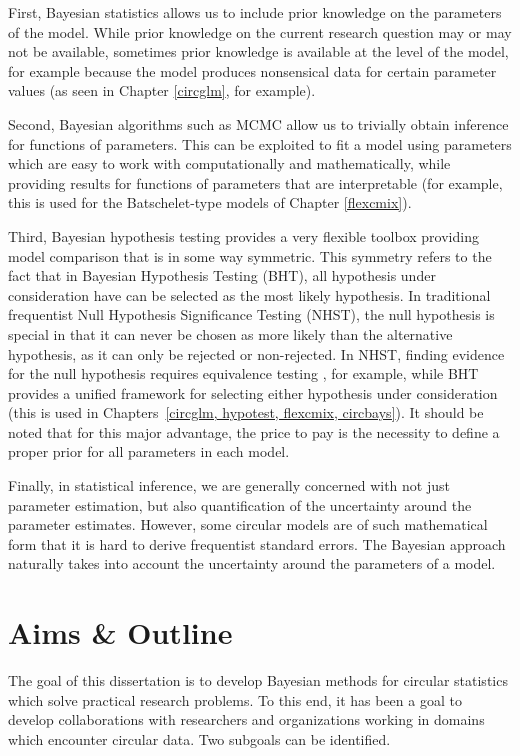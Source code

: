 \documentclass[12pt, a4paper]{book}\usepackage[]{graphicx}\usepackage[]{color}
\begin{document}
First, Bayesian statistics allows us to include prior knowledge on the parameters of the model. While prior knowledge on the current research question may or may not be available, sometimes prior knowledge is available at the level of the model, for example because the model produces nonsensical data for certain parameter values (as seen in Chapter \ref{circglm}, for example).

Second, Bayesian algorithms such as MCMC allow us to trivially obtain inference for functions of parameters. This can be exploited to fit a model using parameters which are easy to work with computationally and mathematically, while providing results for functions of parameters that are interpretable (for example, this is used for the Batschelet-type models of Chapter \ref{flexcmix}).

Third, Bayesian hypothesis testing provides a very flexible toolbox providing model comparison that is in some way symmetric. This symmetry refers to the fact that in Bayesian Hypothesis Testing (BHT), all hypothesis under consideration have can be selected as the most likely hypothesis. In traditional frequentist Null Hypothesis Significance Testing (NHST), the null hypothesis is special in that it can never be chosen as more likely than the alternative hypothesis, as it can only be rejected or non-rejected. In NHST, finding evidence for the null hypothesis requires equivalence testing \citep{wellek2010testing}, for example, while BHT provides a unified framework for selecting either hypothesis under consideration (this is used in Chapters~\ref{circglm, hypotest, flexcmix, circbays}). It should be noted that for this major advantage, the price to pay is the necessity to define a proper prior for all parameters in each model.

Finally, in statistical inference, we are generally concerned with not just parameter estimation, but also quantification of the uncertainty around the parameter estimates. However, some circular models are of such mathematical form that it is hard to derive frequentist standard errors. The Bayesian approach naturally takes into account the uncertainty around the parameters of a model.

\section{Aims \& Outline}

The goal of this dissertation is to develop Bayesian methods for circular statistics which solve practical research problems. To this end, it has been a goal to develop collaborations with researchers and organizations working in domains which encounter circular data. Two subgoals can be identified.
\end{document}
